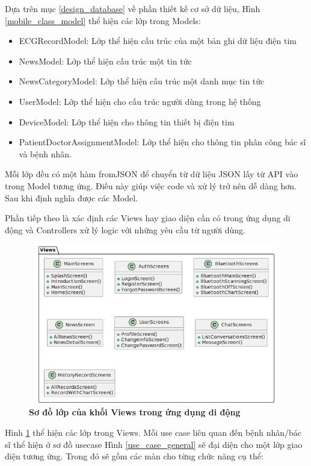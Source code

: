 \begin{enumerate}[a)]
  Dựa trên mục \ref{design_database} về phần thiết kế cơ sở dữ liệu, Hình \ref{mobile_class_model} thể hiện các lớp trong Models:
  \begin{itemize}
    \item ECGRecordModel: Lớp thể hiện cấu trúc của một bản ghi dữ liệu điện tim
    \item NewsModel: Lớp thể hiện cấu trúc một tin tức
    \item NewsCategoryModel: Lớp thể hiện cấu trúc một danh mục tin tức
    \item UserModel: Lớp thể hiện cho cấu trúc người dùng trong hệ thống
    \item DeviceModel: Lớp thể hiện cho thông tin thiết bị điện tim 
    \item PatientDoctorAssignmentModel: Lớp thể hiện cho thông tin phân công bác sĩ và bệnh nhân.
  \end{itemize}

  Mỗi lớp đều có một hàm fromJSON để chuyển từ dữ liệu JSON lấy từ API vào trong Model tương ứng. Điều này giúp
  việc code và xử lý trở nên dễ dàng hơn. Sau khi định nghĩa được các Model.
  
  Phần tiếp theo là xác định các Views hay giao diện cần có trong ứng dụng di động và Controllers xử lý logic với những
  yêu cầu từ người dùng.

  \begin{figure}[H]
    \centering
    \includegraphics[width=14cm,height=7cm]{Images/mobile_app/class_diagram/mobile_class_view.png}
    \caption[Sơ đồ lớp của khối Views trong ứng dụng di động]{\bfseries \fontsize{12pt}{0pt}\selectfont Sơ đồ lớp của khối Views trong ứng dụng di động}
    \label{mobile_class_view} %
  \end{figure}

  Hình \ref{mobile_class_view} thể hiện các lớp trong Views. Mỗi use case liên quan đến bệnh nhân/bác sĩ thể hiện ở sơ đồ 
  usecase Hình \ref{use_case_general} sẽ đại diện cho một lớp giao diện tương ứng. Trong đó sẽ gồm các màn cho từng chức năng
  cụ thể:


\end{enumerate}

